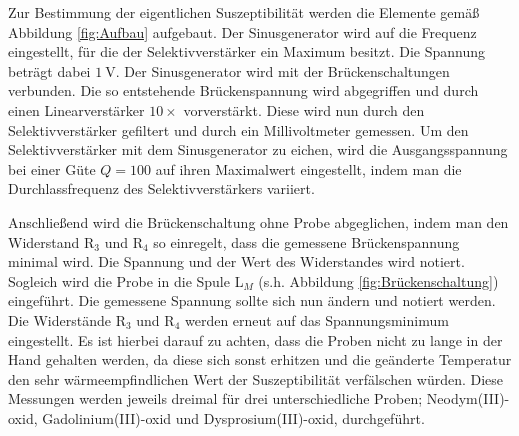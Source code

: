 Zur Bestimmung der eigentlichen Suszeptibilität werden die Elemente gemäß Abbildung \ref{fig:Aufbau} aufgebaut.
Der Sinusgenerator wird auf die Frequenz eingestellt, für die der Selektivverstärker ein Maximum besitzt.
Die Spannung beträgt dabei $\SI{1}{\volt}$.
Der Sinusgenerator wird mit der Brückenschaltungen verbunden.
Die so entstehende Brückenspannung wird abgegriffen und durch einen Linearverstärker $10\times$ vorverstärkt.
Diese wird nun durch den Selektivverstärker gefiltert und durch ein Millivoltmeter gemessen.
Um den Selektivverstärker mit dem Sinusgenerator zu eichen, wird die Ausgangsspannung bei einer Güte $Q = 100$ auf ihren Maximalwert eingestellt, indem man die Durchlassfrequenz des Selektivverstärkers variiert.

Anschließend wird die Brückenschaltung ohne Probe abgeglichen, indem man den Widerstand R$_3$ und R$_4$ so einregelt, dass die gemessene Brückenspannung minimal wird.
Die Spannung und der Wert des Widerstandes wird notiert.
Sogleich wird die Probe in die Spule L$_M$ (s.h. Abbildung \ref{fig:Brückenschaltung}) eingeführt.
Die gemessene Spannung sollte sich nun ändern und notiert werden.
Die Widerstände R$_3$ und R$_4$ werden erneut auf das Spannungsminimum eingestellt.
Es ist hierbei darauf zu achten, dass die Proben nicht zu lange in der Hand gehalten werden, da diese sich sonst erhitzen und die geänderte Temperatur den sehr wärmeempfindlichen Wert der Suszeptibilität verfälschen würden.
Diese Messungen werden jeweils dreimal für drei unterschiedliche Proben; Neodym(III)-oxid, Gadolinium(III)-oxid und Dysprosium(III)-oxid, durchgeführt.
